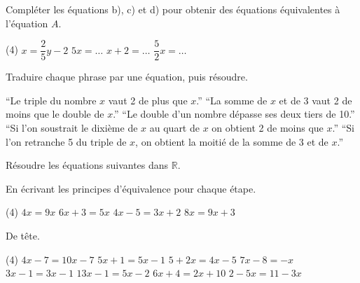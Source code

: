 \documentclass[a4paper,12pt]{report}
\begin{document}
\begin{exo}[1]
Compléter les équations b), c) et d) pour obtenir des équations équivalentes à l'équation $A$.
	\begin{tasks}(4)
\task $x=\dfrac{2}{5} y-2$
\task $5 x=\ldots$
\task $x+2=\ldots$
\task $\dfrac{5}{2} x=\ldots$
	\end{tasks}
\end{exo}
\begin{exo}[2]
Traduire chaque phrase par une équation, puis résoudre.
	\begin{tasks}
		\task \enquote{Le triple du nombre $x$ vaut 2 de plus que $x$.}
		\task \enquote{La somme de $x$ et de 3 vaut 2 de moins que le double de $x$.}
	\task \enquote{Le double d'un nombre dépasse ses deux tiers de 10.}
\task \enquote{Si l'on soustrait le dixième de $x$ au quart de $x$ on obtient 2 de moins que $x$.}
\task \enquote{Si l'on retranche 5 du triple de $x$, on obtient la moitié de la somme de 3 et de $x$.}
	\end{tasks}
\end{exo}

Résoudre les équations suivantes dans $\mathbb{R}$.

En écrivant les principes d'équivalence pour chaque étape.
	\begin{tasks}(4)
\task $4 x=9 x$
\task $6 x+3=5 x$
\task $4 x-5=3 x+2$
\task $8 x=9 x+3$
\end{tasks}
De tête.
\begin{tasks}(4)
\task $4 x-7=10 x-7$
\task $5 x+1=5 x-1$
\task $5+2 x=4 x-5$
\task $7 x-8=-x$
\task $3 x-1=3 x-1$
\task $13 x-1=5 x-2$
\task $6 x+4=2 x+10$
\task $2-5 x=11-3 x$
\end{tasks}
\end{document}
